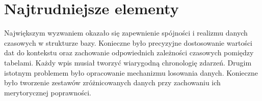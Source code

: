 \documentclass{article}
\theoremstyle{definition}
\begin{document}
	\section{Najtrudniejsze elementy}
		
	Największym wyzwaniem okazało się zapewnienie spójności i realizmu danych czasowych w strukturze bazy. Konieczne było precyzyjne dostosowanie wartości dat do kontekstu oraz zachowanie odpowiednich zależności czasowych pomiędzy tabelami. Każdy wpis musiał tworzyć wiarygodną chronologię zdarzeń. Drugim istotnym problemem było opracowanie mechanizmu losowania danych. Konieczne było tworzenie zestawów zróżnicowanych danych przy zachowaniu ich merytorycznej poprawności. 
	
	
\end{document}
